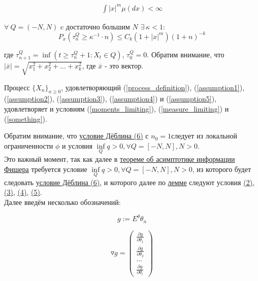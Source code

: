 \begin{equation} \label{measure_limiting}
    \begin{split}
        \int |x|^m \mu (dx) < \infty
    \end{split}
\end{equation}

$\forall \ Q=\left(-N, N\right)$ c достаточно большим $N$ $\exists \ \kappa < 1$:
\begin{equation} \label{something}
	P_x\left(\tau^Q_n \ge \kappa^{-1}\cdot n \right) \le C_k \left( 1 +|x|^m \right)\left(1 + n\right)^{-k}
\end{equation}
\begin{flushleft}
	{
	\setlength{\leftskip}{5em}
		\setlength{\rightskip}{5em}
    	где $\tau^Q_{n+1}=\inf \left(t\ge \tau^Q_n +1 : X_t \in Q \right)$, $\tau^Q_0 = 0$. Обратим внимание, что $\left|\bar{x}\right|=\sqrt{x^2_1+x^2_2+...+x^2_k}$, где $\bar{x}$ - это вектор.
    	\\
	}
\end{flushleft}

	

	
\begin{Lemma} \label{VeretennikovLemma1}
	Процесс $\{X_n\}_{n \geqslant 0}$, удовлетворяющий (\ref{process_definition}), (\ref{assumption1}), (\ref{assumption2}), (\ref{assumption3}), (\ref{assumption4}) и (\ref{assumption5}), удовлетворяет и условиям (\ref{moments_limiting}), (\ref{measure_limiting}) и (\ref{something}).
\end{Lemma}

	Обратим внимание, что \hyperref[Deblin]{условие Дёблина (6)} с $n_0 = 1$следует из локальной ограниченности $\phi$ и условия $\inf\limits_{Q} q>0, \forall Q=[-N, N], N>0$.
	\\
	Это важный момент, так как далее в \hyperref[FisherInformationAsimptotic]{теореме об асимптотике информации Фишера} требуется условие $\inf\limits_{Q} q>0, \forall Q=[-N, N], N>0$,  из которого будет следовать \hyperref[Deblin]{условие Дёблина (6)}, и которого далее по \hyperref[VeretennikovLemma1]{лемме} следуют условия \hyperref[usl2]{(2)}, \hyperref[usl3]{(3)}, \hyperref[usl4]{(4)}, \hyperref[usl5]{(5)}.
	\\
	Далее введём несколько обозначений: %
	
	$$
	g := E^{\theta}\theta_n
	$$
	
	$$
	\triangledown g = \left(\begin{array}{ccc} \frac{\partial g}{\partial \theta_1} \\ \frac{\partial g}{\partial \theta_2} \\ ... \\ \frac{\partial g}{\partial \theta_l} \end{array}\right)
	$$
	
